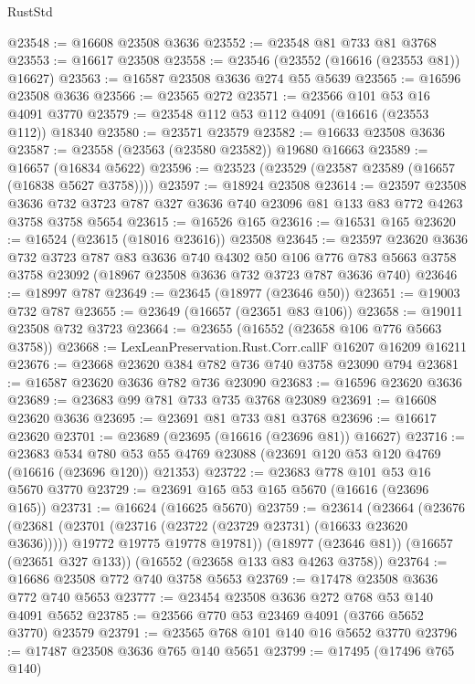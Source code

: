 \begin{lexlean}{RustStd}
\begin{coremodule}
@23548 := @16608 @23508 @3636
@23552 := @23548 @81 @733 @81 @3768
@23553 := @16617 @23508
@23558 := @23546 (@23552 (@16616 (@23553 @81)) @16627)
@23563 := @16587 @23508 @3636 @274 @55 @5639
@23565 := @16596 @23508 @3636
@23566 := @23565 @272
@23571 := @23566 @101 @53 @16 @4091 @3770
@23579 := @23548 @112 @53 @112 @4091 (@16616 (@23553 @112)) @18340
@23580 := @23571 @23579
@23582 := @16633 @23508 @3636
@23587 := @23558 (@23563 (@23580 @23582)) @19680 @16663
@23589 := @16657 (@16834 @5622)
@23596 := @23523 (@23529 (@23587 @23589 (@16657 (@16838 @5627 @3758))))
@23597 := @18924 @23508
@23614 := @23597
    @23508
    @3636
    @732
    @3723
    @787
    @327
    @3636
    @740
    @23096
    @81
    @133
    @83
    @772
    @4263
    @3758
    @3758
    @5654
@23615 := @16526 @165
@23616 := @16531 @165
@23620 := @16524 (@23615 (@18016 @23616)) @23508
@23645 := @23597
    @23620
    @3636
    @732
    @3723
    @787
    @83
    @3636
    @740
    @4302
    @50
    @106
    @776
    @783
    @5663
    @3758
    @3758
    @23092
    (@18967 @23508 @3636 @732 @3723 @787 @3636 @740)
@23646 := @18997 @787
@23649 := @23645 (@18977 (@23646 @50))
@23651 := @19003 @732 @787
@23655 := @23649 (@16657 (@23651 @83 @106))
@23658 := @19011 @23508 @732 @3723
@23664 := @23655 (@16552 (@23658 @106 @776 @5663 @3758))
@23668 := LexLeanPreservation.Rust.Corr.callF @16207 @16209 @16211
@23676 := @23668 @23620 @384 @782 @736 @740 @3758 @23090 @794
@23681 := @16587 @23620 @3636 @782 @736 @23090
@23683 := @16596 @23620 @3636
@23689 := @23683 @99 @781 @733 @735 @3768 @23089
@23691 := @16608 @23620 @3636
@23695 := @23691 @81 @733 @81 @3768
@23696 := @16617 @23620
@23701 := @23689 (@23695 (@16616 (@23696 @81)) @16627)
@23716 := @23683
    @534
    @780
    @53
    @55
    @4769
    @23088
    (@23691 @120 @53 @120 @4769 (@16616 (@23696 @120)) @21353)
@23722 := @23683 @778 @101 @53 @16 @5670 @3770
@23729 := @23691 @165 @53 @165 @5670 (@16616 (@23696 @165))
@23731 := @16624 (@16625 @5670)
@23759 := @23614
    (@23664
      (@23676
        (@23681 (@23701 (@23716 (@23722 (@23729 @23731) (@16633 @23620 @3636)))))
        @19772
        @19775
        @19778
        @19781))
    (@18977 (@23646 @81))
    (@16657 (@23651 @327 @133))
    (@16552 (@23658 @133 @83 @4263 @3758))
@23764 := @16686 @23508 @772 @740 @3758 @5653
@23769 := @17478 @23508 @3636 @772 @740 @5653
@23777 := @23454 @23508 @3636 @272 @768 @53 @140 @4091 @5652
@23785 := @23566 @770 @53 @23469 @4091 (@3766 @5652 @3770) @23579
@23791 := @23565 @768 @101 @140 @16 @5652 @3770
@23796 := @17487 @23508 @3636 @765 @140 @5651
@23799 := @17495 (@17496 @765 @140)

\end{coremodule}
\end{lexlean}
